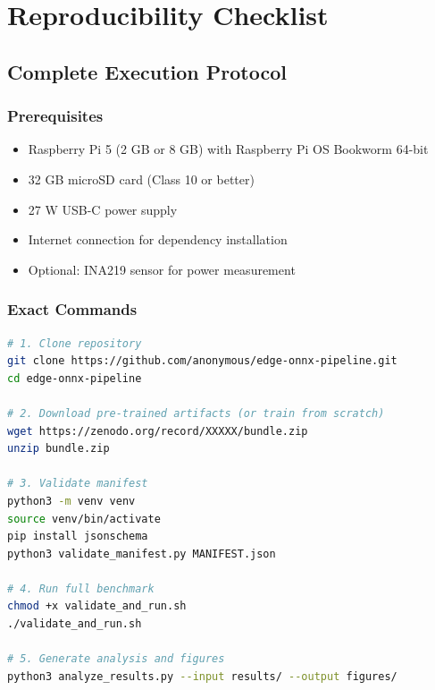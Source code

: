 \documentclass[review]{elsarticle}
\begin{document}
\section{Reproducibility Checklist}
\label{sec:reproducibility-checklist}

\subsection{Complete Execution Protocol}

\subsubsection{Prerequisites}

\begin{itemize}
\item Raspberry Pi 5 (2 GB or 8 GB) with Raspberry Pi OS Bookworm 64-bit
\item 32 GB microSD card (Class 10 or better)
\item 27 W USB-C power supply
\item Internet connection for dependency installation
\item Optional: INA219 sensor for power measurement
\end{itemize}

\subsubsection{Exact Commands}

\begin{lstlisting}[language=bash,caption={Complete reproduction script}]
# 1. Clone repository
git clone https://github.com/anonymous/edge-onnx-pipeline.git
cd edge-onnx-pipeline

# 2. Download pre-trained artifacts (or train from scratch)
wget https://zenodo.org/record/XXXXX/bundle.zip
unzip bundle.zip

# 3. Validate manifest
python3 -m venv venv
source venv/bin/activate
pip install jsonschema
python3 validate_manifest.py MANIFEST.json

# 4. Run full benchmark
chmod +x validate_and_run.sh
./validate_and_run.sh

# 5. Generate analysis and figures
python3 analyze_results.py --input results/ --output figures/
\end{lstlisting}
\end{document}
